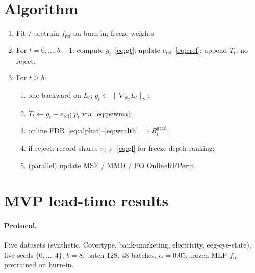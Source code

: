 \documentclass[11pt]{article}
\newcommand{\gradU}{\nabla_{\theta_U}}
\begin{document}
\section{Algorithm}
\label{sec:algo}

\begin{enumerate}[leftmargin=*,itemsep=0.35em]
  \item Fit / pretrain $f_{\mathrm{ref}}$ on burn-in; freeze weights.
  \item For $t=0,\ldots,b-1$: compute $g_t$~\eqref{eq:gt}; update
        $e_{\mathrm{ref}}$~\eqref{eq:eref}; append $T_t$; no reject.
  \item For $t\ge b$:
  \begin{enumerate}[label=(\alph*),itemsep=0.2em]
    \item one backward on $L_t$; $g_t\leftarrow\|\gradU L_t\|_2$;
    \item $T_t\leftarrow g_t-e_{\mathrm{ref}}$; $p_t$ via~\eqref{eq:pewma};
    \item online FDR~\eqref{eq:alphat}--\eqref{eq:wealth}
          $\Rightarrow R_t^{\mathrm{grad}}$;
    \item if reject: record shares $\pi_{t,\ell}$~\eqref{eq:gl}
          for freeze-depth ranking;
    \item (parallel) update MSE / MMD / PO OnlineRFPerm.
  \end{enumerate}
\end{enumerate}

\section{MVP lead-time results}
\label{sec:mvp}

\paragraph{Protocol.}
Five datasets (synthetic, Covertype, bank-marketing, electricity,
eeg-eye-state), five seeds $\{0,\ldots,4\}$,
$b=8$, batch $128$, $48$ batches, $\alpha=0.05$,
frozen MLP $f_{\mathrm{ref}}$ pretrained on burn-in.
\end{document}
